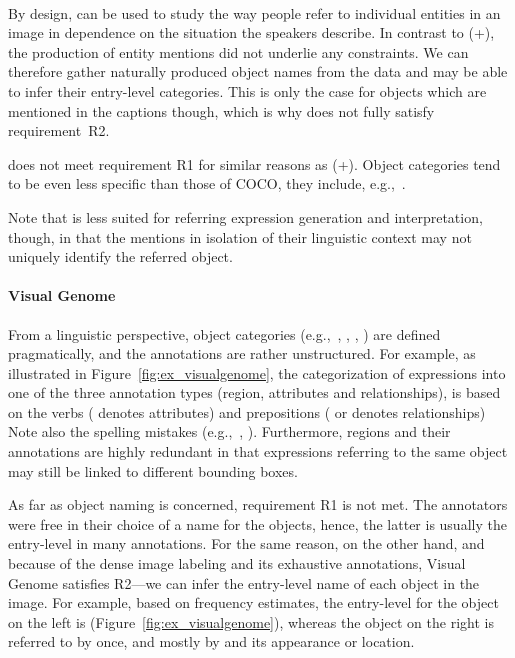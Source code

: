 {\paragraph{\flickr}
By design, \flickr can be used to study the way people refer to individual entities in an image in dependence on the situation the speakers describe. 
In contrast to (+), the production of entity mentions did not underlie any constraints. 
We can therefore gather naturally produced object names from the data and may be able to infer their entry-level categories. 
This is only the case for objects which are mentioned in the captions though, which is why \flickr does not fully satisfy requirement~R2. 

\flickr does not meet requirement R1 for similar reasons as (+). 
Object categories tend to be even less specific than those of COCO, they include, e.g.,~.

Note that \flickr is less suited for referring expression generation and interpretation, though, in that the mentions in isolation of their linguistic context may not uniquely identify the referred object. 


\paragraph{Visual Genome}
From a linguistic perspective, object categories (e.g.,~, , , ) are defined pragmatically, and the annotations are rather unstructured. 
For example, as illustrated in Figure~\ref{fig:ex_visualgenome}, the categorization of expressions into one of the three annotation types (region, attributes and relationships), is based on the verbs ( denotes attributes) and prepositions ( or  denotes relationships) 
Note also the spelling mistakes (e.g.,~, ). 
Furthermore, regions and their annotations are highly redundant in that expressions referring to the same object may still be linked to different bounding boxes. 


As far as object naming is concerned, requirement R1 is not met.    
The annotators were free in their choice of a name for the objects, hence, the latter is usually the entry-level in many annotations. 
For the same reason, on the other hand, and because of the dense image labeling and its exhaustive annotations, Visual Genome satisfies R2---we can infer the entry-level name of each object in the image. 
For example, based on frequency estimates, the entry-level for the object on the left is  (Figure~\ref{fig:ex_visualgenome}), whereas the object on the right is referred to by  once, and mostly by  and its appearance or location. \\


}

